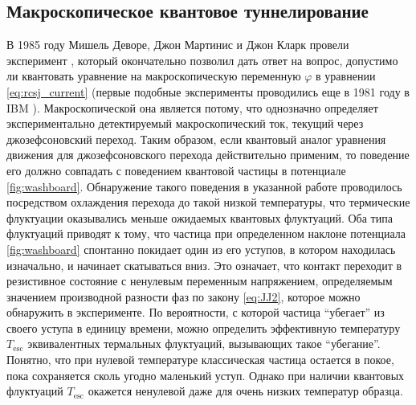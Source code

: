 \documentclass[14pt, a4paper]{extreport}
\numberwithin{equation}{section}
\begin{document}
\subsection{Макроскопическое квантовое туннелирование}

В 1985 году Мишель Деворе, Джон Мартинис и Джон Кларк провели эксперимент \cite{devoret1985measurements}, который окончательно позволил дать ответ на вопрос, допустимо ли квантовать уравнение на макроскопическую переменную $\varphi$ в уравнении \eqref{eq:rcsj_current} (первые подобные эксперименты проводились еще в 1981 году в IBM \cite{voss1981macroscopic}). Макроскопической она является потому, что однозначно определяет экспериментально детектируемый макроскопический ток, текущий через джозефсоновский переход. Таким образом, если квантовый аналог уравнения движения для джозефсоновского перехода действительно применим, то поведение его должно совпадать с поведением квантовой частицы в потенциале \autoref{fig:washboard}. Обнаружение такого поведения в указанной работе проводилось посредством охлаждения перехода до такой низкой температуры, что термические флуктуации оказывались меньше ожидаемых квантовых флуктуаций. 
Оба типа флуктуаций приводят к тому, что частица при определенном наклоне потенциала \autoref{fig:washboard} спонтанно покидает один из его уступов, в котором находилась изначально, и начинает скатываться вниз. Это означает, что контакт переходит в резистивное состояние с ненулевым переменным напряжением, определяемым значением производной разности фаз по закону \eqref{eq:JJ2}, которое можно обнаружить в эксперименте. По вероятности, с которой частица ``убегает'' из своего уступа в единицу времени, можно определить эффективную температуру $T_\text{esc}$ эквивалентных термальных флуктуаций, вызывающих такое ``убегание''. Понятно, что при нулевой температуре классическая частица остается в покое, пока сохраняется сколь угодно маленький уступ. Однако при наличии квантовых флуктуаций $T_\text{esc}$ окажется ненулевой даже для очень низких температур образца. 
\end{document}
